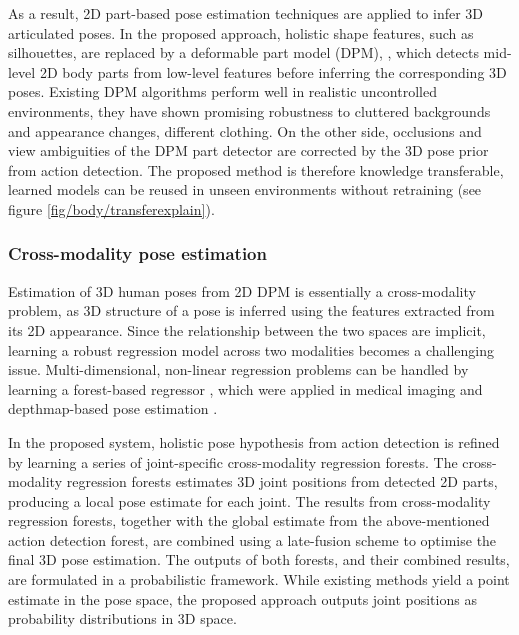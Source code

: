 As a result, 2D part-based pose estimation techniques are applied to infer 3D articulated poses. 
In the proposed approach, holistic shape features, such as silhouettes, are replaced by a deformable part model (DPM), \eg \cite{Yang2011}, which detects mid-level 2D body parts from low-level features before inferring the corresponding 3D poses. 
Existing DPM algorithms perform well in realistic uncontrolled environments, they have shown promising robustness to cluttered backgrounds and appearance changes, \eg different clothing. 
On the other side, occlusions and view ambiguities of the DPM part detector are corrected by the 3D pose prior from action detection.    
The proposed method is therefore knowledge transferable, learned models can be reused in unseen environments without retraining (see figure \ref{fig/body/transferexplain}). 

\subsubsection{Cross-modality pose estimation} 

Estimation of 3D human poses from 2D DPM is essentially a cross-modality problem, as 3D structure of a pose is inferred using the features extracted from its 2D appearance. 
Since the relationship between the two spaces are implicit, learning a robust regression model across two modalities becomes a challenging issue. 
Multi-dimensional, non-linear regression problems can be handled by learning a forest-based regressor \cite{Shotton2013}, which were applied in medical imaging \cite{Criminisi2011} and depthmap-based pose estimation \cite{Girshick2011}.  

In the proposed system, holistic pose hypothesis from action detection is refined by learning a series of joint-specific cross-modality regression forests. 
The cross-modality regression forests estimates 3D joint positions from detected 2D parts, producing a local pose estimate for each joint. 
The results from cross-modality regression forests, together with the global estimate from the above-mentioned action detection forest, are combined using a late-fusion scheme to optimise the final 3D pose estimation. 
The outputs of both forests, and their combined results, are formulated in a probabilistic framework. While existing methods yield a point estimate in the pose space, the proposed approach outputs joint positions as probability distributions in 3D space. 


